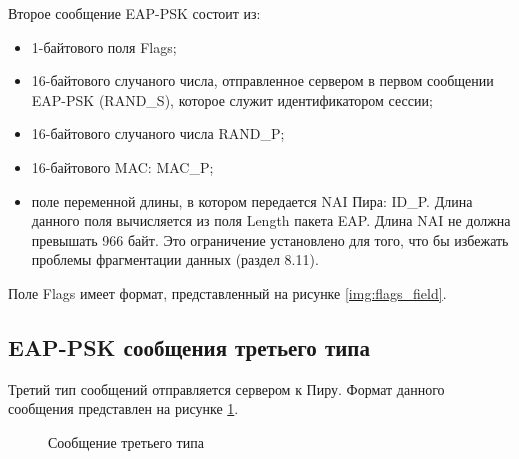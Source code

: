 Второе сообщение EAP-PSK состоит из:

\begin{itemize}
\item 1-байтового поля Flags;
\item 16-байтового случаного числа, отправленное сервером в первом сообщении EAP-PSK (RAND\_S), которое служит идентификатором сессии;
\item 16-байтового случаного числа RAND\_P;
\item 16-байтового MAC: MAC\_P;
\item поле переменной длины, в котором передается NAI Пира: ID\_P. Длина данного поля вычисляется из поля Length пакета EAP. Длина NAI не должна превышать 966 байт. Это ограничение установлено для того, что бы избежать проблемы фрагментации данных (раздел 8.11).
\end{itemize}

Поле Flags имеет формат, представленный на рисунке \ref{img:flags_field}.

\subsection{EAP-PSK сообщения третьего типа}

Третий тип сообщений отправляется сервером к Пиру. Формат данного сообщения представлен на рисунке \ref{img:message_type3}.

\begin{figure}[h!]
\caption{Сообщение третьего типа}
\label{img:message_type3}
\end{figure}

